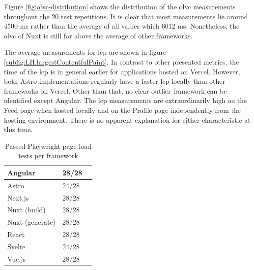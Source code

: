 \documentclass[a4paper, 10pt]{article}
\begin{document}
Figure \ref{fig:olvc-distribution} shows the distribution of the \acrshort{olvc} measurements throughout the 20 test repetitions.
It is clear that most measurements lie around 4500 ms rather than the average of all values which 6012 ms.
Nonetheless, the \acrshort{olvc} of Nuxt is still far above the average of other frameworks.

The average measurements for \acrfull{lcp} are shown in figure \ref{subfig:LH:largestContentfulPaint}.
In contrast to other presented metrics, the time of the \acrshort{lcp} is in general earlier for applications hosted on Vercel.
However, both Astro implementations regularly have a faster \acrshort{lcp} locally than other frameworks on Vercel.
Other than that, no clear outlier framework can be identified except Angular.
The \acrshort{lcp} measurements are extraordinarily high on the Feed page when hosted locally and on the Profile page independently from the hosting environment.
There is no apparent explanation for either characteristic at this time.

\begin{table}[!ht]
  \centering
  \begin{tabular}{|l|l|l|}
    \hline
    Angular         & 28/28 \\ \hline
    Astro           & 24/28 \\ \hline
    Next.js         & 28/28 \\ \hline
    Nuxt (build)    & 28/28 \\ \hline
    Nuxt (generate) & 28/28 \\ \hline
    React           & 28/28 \\ \hline
    Svelte          & 24/28 \\ \hline
    Vue.js          & 28/28 \\ \hline
  \end{tabular}
  \caption{Passed Playwright page load tests per framework}
  \label{tab:playwright:pageLoad}
\end{table}
\end{document}
